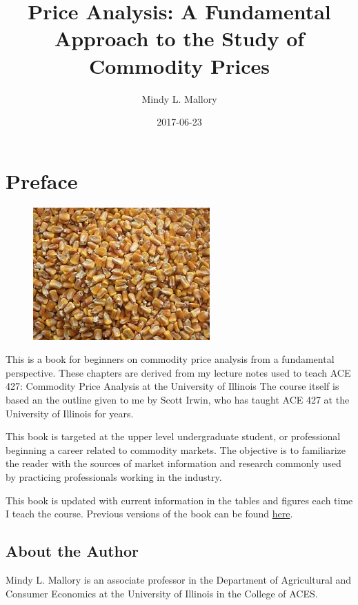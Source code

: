 \documentclass[]{book}
\title{Price Analysis: A Fundamental Approach to the Study of Commodity Prices}
\author{Mindy L. Mallory}
\date{2017-06-23}
\theoremstyle{definition}
\theoremstyle{definition}
\theoremstyle{remark}
\begin{document}
\maketitle

{
\setcounter{tocdepth}{1}
\tableofcontents
}
\chapter*{Preface}\label{preface}

\begin{figure}[htbp]
\centering
\includegraphics{images/cover.jpg}
\caption{}
\end{figure}

This is a book for beginners on commodity price analysis from a
fundamental perspective. These chapters are derived from my lecture
notes used to teach ACE 427: Commodity Price Analysis at the University
of Illinois The course itself is based an the outline given to me by
Scott Irwin, who has taught ACE 427 at the University of Illinois for
years.

This book is targeted at the upper level undergraduate student, or
professional beginning a career related to commodity markets. The
objective is to familiarize the reader with the sources of market
information and research commonly used by practicing professionals
working in the industry.

This book is updated with current information in the tables and figures
each time I teach the course. Previous versions of the book can be found
\href{https://github.com/mindymallory/PriceAnalysis/releases}{here}.

\section*{About the Author}\label{about-the-author}

Mindy L. Mallory is an associate professor in the Department of
Agricultural and Consumer Economics at the University of Illinois in the
College of ACES.
\end{document}
